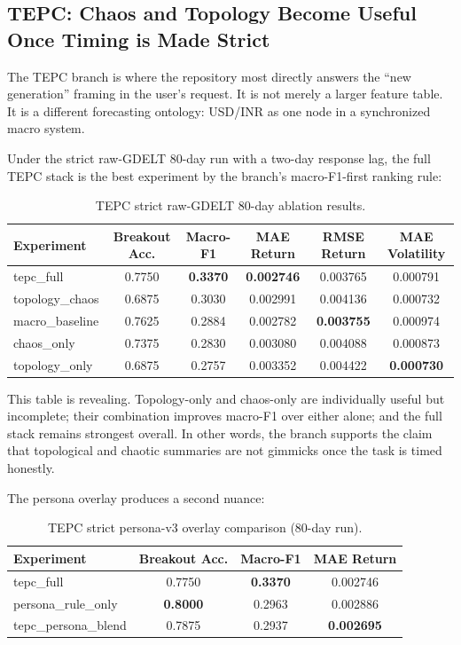 \documentclass[11pt,a4paper]{article}
\begin{document}
\subsection{TEPC: Chaos and Topology Become Useful Once Timing is Made Strict}

The TEPC branch is where the repository most directly answers the ``new generation'' framing in the user's request. It is not merely a larger feature table. It is a different forecasting ontology: USD/INR as one node in a synchronized macro system.

Under the strict raw-GDELT 80-day run with a two-day response lag, the full TEPC stack is the best experiment by the branch's macro-F1-first ranking rule:

\begin{table}[t]
\centering
\small
\caption{TEPC strict raw-GDELT 80-day ablation results.}
\label{tab:tepc_strict}
\begin{tabular}{lccccc}
\toprule
\textbf{Experiment} & \textbf{Breakout Acc.} & \textbf{Macro-F1} & \textbf{MAE Return} & \textbf{RMSE Return} & \textbf{MAE Volatility} \\
\midrule
tepc\_full & 0.7750 & \textbf{0.3370} & \textbf{0.002746} & 0.003765 & 0.000791 \\
topology\_chaos & 0.6875 & 0.3030 & 0.002991 & 0.004136 & 0.000732 \\
macro\_baseline & 0.7625 & 0.2884 & 0.002782 & \textbf{0.003755} & 0.000974 \\
chaos\_only & 0.7375 & 0.2830 & 0.003080 & 0.004088 & 0.000873 \\
topology\_only & 0.6875 & 0.2757 & 0.003352 & 0.004422 & \textbf{0.000730} \\
\bottomrule
\end{tabular}
\end{table}

This table is revealing. Topology-only and chaos-only are individually useful but incomplete; their combination improves macro-F1 over either alone; and the full stack remains strongest overall. In other words, the branch supports the claim that topological and chaotic summaries are not gimmicks once the task is timed honestly.

The persona overlay produces a second nuance:

\begin{table}[t]
\centering
\small
\caption{TEPC strict persona-v3 overlay comparison (80-day run).}
\label{tab:tepc_persona}
\begin{tabular}{lccc}
\toprule
\textbf{Experiment} & \textbf{Breakout Acc.} & \textbf{Macro-F1} & \textbf{MAE Return} \\
\midrule
tepc\_full & 0.7750 & \textbf{0.3370} & 0.002746 \\
persona\_rule\_only & \textbf{0.8000} & 0.2963 & 0.002886 \\
tepc\_persona\_blend & 0.7875 & 0.2937 & \textbf{0.002695} \\
\bottomrule
\end{tabular}
\end{table}
\end{document}
